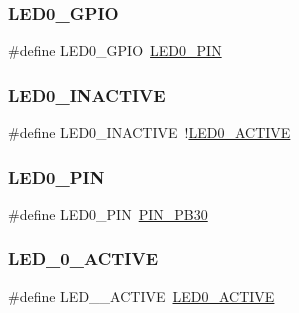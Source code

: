 \subsubsection{\texorpdfstring{LED0\_GPIO}{LED0\_GPIO}}
{\footnotesize\ttfamily \#define L\+E\+D0\+\_\+\+G\+P\+IO~\mbox{\hyperlink{group__samd21__xplained__pro__features__group_ga3fc522fda449d6edde717d6a857429cf}{L\+E\+D0\+\_\+\+P\+IN}}}

\mbox{\label{group__samd21__xplained__pro__features__group_gaed3274cfe7ed308899e8416219bb08d2}} 
\subsubsection{\texorpdfstring{LED0\_INACTIVE}{LED0\_INACTIVE}}
{\footnotesize\ttfamily \#define L\+E\+D0\+\_\+\+I\+N\+A\+C\+T\+I\+VE~!\mbox{\hyperlink{group__samd21__xplained__pro__features__group_ga59e133b8ded0d632eeaeb2cbfec48886}{L\+E\+D0\+\_\+\+A\+C\+T\+I\+VE}}}

\mbox{\label{group__samd21__xplained__pro__features__group_ga3fc522fda449d6edde717d6a857429cf}} 
\subsubsection{\texorpdfstring{LED0\_PIN}{LED0\_PIN}}
{\footnotesize\ttfamily \#define L\+E\+D0\+\_\+\+P\+IN~\mbox{\hyperlink{pio_2samd21j18a_8h_a5ff751a11f710f459e0ccb12b6db3e29}{P\+I\+N\+\_\+\+P\+B30}}}

\mbox{\label{group__samd21__xplained__pro__features__group_ga88e5571eae6020697efb61d64d41fe3a}} 
\subsubsection{\texorpdfstring{LED\_0\_ACTIVE}{LED\_0\_ACTIVE}}
{\footnotesize\ttfamily \#define L\+E\+D\+\_\+\_\+\+A\+C\+T\+I\+VE~\mbox{\hyperlink{group__samd21__xplained__pro__features__group_ga59e133b8ded0d632eeaeb2cbfec48886}{L\+E\+D0\+\_\+\+A\+C\+T\+I\+VE}}}

